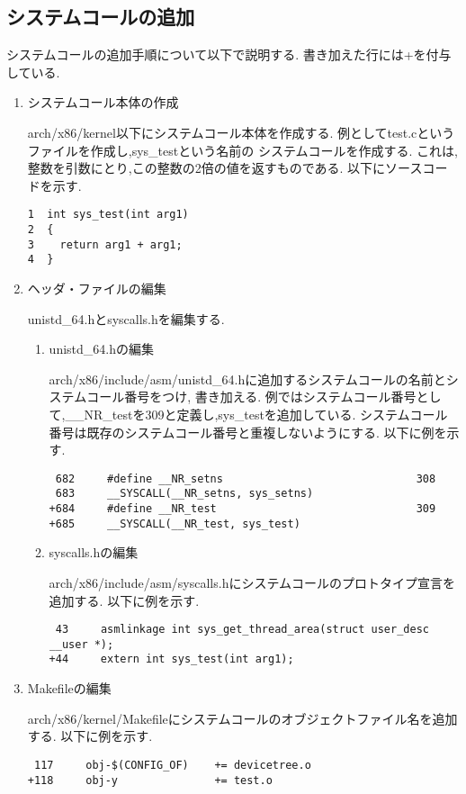 \documentclass[12pt]{jsarticle}
\begin{document}
\subsection{システムコールの追加}
システムコールの追加手順について以下で説明する.
書き加えた行には+を付与している.
\begin{enumerate}
\item システムコール本体の作成

arch/x86/kernel以下にシステムコール本体を作成する.
例としてtest.cというファイルを作成し,sys\_testという名前の
システムコールを作成する.
これは,整数を引数にとり,この整数の2倍の値を返すものである.
以下にソースコードを示す.

\begin{verbatim}
1  int sys_test(int arg1)
2  {
3    return arg1 + arg1;
4  } 
\end{verbatim}

\item ヘッダ・ファイルの編集

unistd\_64.hとsyscalls.hを編集する.
\begin{enumerate}
\item unistd\_64.hの編集

arch/x86/include/asm/unistd\_64.hに追加するシステムコールの名前とシステムコール番号をつけ,
書き加える.
例ではシステムコール番号として,\_\_NR\_testを309と定義し,sys\_testを追加している.
システムコール番号は既存のシステムコール番号と重複しないようにする.
以下に例を示す.

\begin{verbatim}
 682     #define __NR_setns                              308
 683     __SYSCALL(__NR_setns, sys_setns)
+684     #define __NR_test                               309
+685     __SYSCALL(__NR_test, sys_test)
\end{verbatim}

\item syscalls.hの編集

arch/x86/include/asm/syscalls.hにシステムコールのプロトタイプ宣言を
追加する.
以下に例を示す.

\begin{verbatim}
 43     asmlinkage int sys_get_thread_area(struct user_desc __user *);
+44     extern int sys_test(int arg1);
\end{verbatim}

\end{enumerate}
\item Makefileの編集

arch/x86/kernel/Makefileにシステムコールのオブジェクトファイル名を追加する.
以下に例を示す.

\begin{verbatim}
 117     obj-$(CONFIG_OF)    += devicetree.o
+118     obj-y               += test.o
\end{verbatim}

\end{enumerate}
\end{document}
